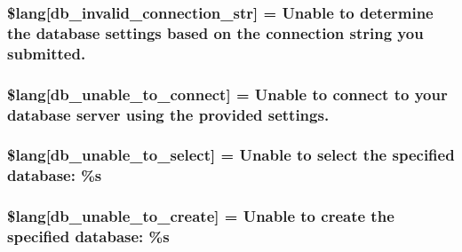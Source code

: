 \subsubsection[{\$lang}]{\setlength{\rightskip}{0pt plus 5cm}\$lang\mbox{[}\textquotesingle{}db\+\_\+invalid\+\_\+connection\+\_\+str\textquotesingle{}\mbox{]} = \textquotesingle{}Unable to determine the database settings based on the connection string you submitted.\textquotesingle{}}\label{db__lang_8php_a0c2ed2613101d37cbaba14042530c16d}
\hypertarget{db__lang_8php_aa5935b86c957eb15ac7d41cf84143d66}{}
\subsubsection[{\$lang}]{\setlength{\rightskip}{0pt plus 5cm}\$lang\mbox{[}\textquotesingle{}db\+\_\+unable\+\_\+to\+\_\+connect\textquotesingle{}\mbox{]} = \textquotesingle{}Unable to connect to your database server using the provided settings.\textquotesingle{}}\label{db__lang_8php_aa5935b86c957eb15ac7d41cf84143d66}
\hypertarget{db__lang_8php_a3c93974df838c0e036690874108715ea}{}
\subsubsection[{\$lang}]{\setlength{\rightskip}{0pt plus 5cm}\$lang\mbox{[}\textquotesingle{}db\+\_\+unable\+\_\+to\+\_\+select\textquotesingle{}\mbox{]} = \textquotesingle{}Unable to select the specified database\+: \%s\textquotesingle{}}\label{db__lang_8php_a3c93974df838c0e036690874108715ea}
\hypertarget{db__lang_8php_a4266e3b235feb16d9cf2e88afd1fedac}{}
\subsubsection[{\$lang}]{\setlength{\rightskip}{0pt plus 5cm}\$lang\mbox{[}\textquotesingle{}db\+\_\+unable\+\_\+to\+\_\+create\textquotesingle{}\mbox{]} = \textquotesingle{}Unable to create the specified database\+: \%s\textquotesingle{}}\label{db__lang_8php_a4266e3b235feb16d9cf2e88afd1fedac}
\hypertarget{db__lang_8php_a2cbf4ee929f45a29a0dcf21280bad485}{}
